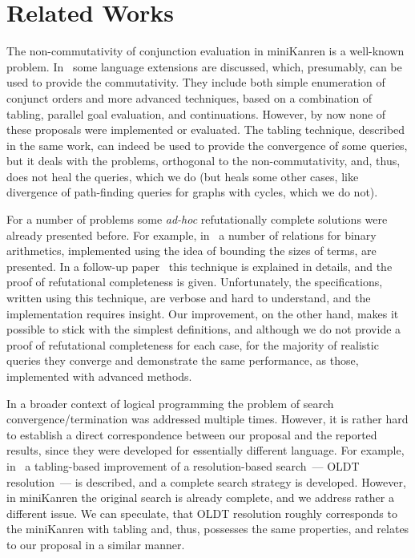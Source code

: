 \section{Related Works}
\label{sec:related_works}

The non-commutativity of conjunction evaluation in miniKanren is a well-known problem. In~\cite{WillThesis} some language
extensions are discussed, which, presumably, can be used to provide the commutativity. They include both simple enumeration
of conjunct orders and more advanced techniques, based on a combination of tabling, parallel goal evaluation, and continuations.
However, by now none of these proposals were implemented or evaluated. The tabling technique, described in the same work, can
indeed be used to provide the convergence of some queries, but it deals with the problems, orthogonal to the non-commutativity,
and, thus, does not heal the queries, which we do (but heals some other cases, like divergence of path-finding queries for
graphs with cycles, which we do not). 

For a number of problems some \emph{ad-hoc} refutationally complete solutions were already presented before. For example,
in~\cite{TRS} a number of relations for binary arithmetics, implemented using the idea of bounding the sizes of terms, are
presented. In a follow-up paper~\cite{KiselyovArithmetic} this technique is explained in details, and the proof of refutational
completeness is given. Unfortunately, the specifications, written using this technique, are verbose and
hard to understand, and the implementation requires insight. Our improvement, on the other hand, makes it possible to stick
with the simplest definitions, and although we do not provide a proof of refutational completeness for each case, for the
majority of realistic queries they converge and demonstrate the same performance, as those, implemented with advanced methods.

In a broader context of logical programming the problem of search convergence/termination was addressed multiple
times. However, it is rather hard to establish a direct correspondence between our proposal and the reported results,
since they were developed for essentially different language. For example, in~\cite{OLDresolution} a tabling-based
improvement of a resolution-based search~--- OLDT resolution~--- is described, and a complete search strategy is developed.
However, in miniKanren the original search is already complete, and we address rather a different issue. We can speculate,
that OLDT resolution roughly corresponds to the miniKanren with tabling and, thus, possesses the same properties, and relates to
our proposal in a similar manner.

